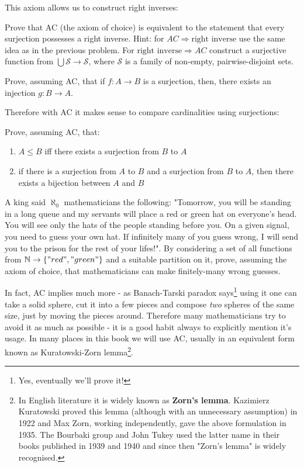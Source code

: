 This axiom allows us to construct right inverses:

\begin{exercise}
  Prove that AC (the axiom of choice) is equivalent to the statement that every surjection possesses a right inverse. Hint: for $AC\Rightarrow \text{right inverse}$ use the same idea as in the previous problem. For
  $\text{right inverse}\Rightarrow AC$ construct a surjective function from $\bigcup \mathcal S\to \mathcal S$, where $\mathcal S$ is a family of non-empty, pairwise-disjoint sets.
\end{exercise}

\begin{exercise}
  Prove, assuming AC, that if $f:A\to B$ is a surjection, then, there exists an injection $g: B\to A$.
\end{exercise}

Therefore with AC it makes sense to compare cardinalities using surjections:

\begin{exercise}
  Prove, assuming AC, that:
  \begin{enumerate}
    \item $A\le B$ iff there exists a surjection from $B$ to $A$
    \item if there is a surjection from $A$ to $B$ and a surjection from $B$ to $A$, then there exists a bijection between $A$ and $B$
  \end{enumerate}
\end{exercise}

\begin{exercise}
  A king said $\aleph_0$ mathematicians the following:
  "Tomorrow, you will be standing in a long queue and my servants will place a red or green hat on everyone's head. You will see only the hats of the people standing before you.
  On a given signal, you need to guess your own hat. If infinitely many of you guess wrong, I will send you to the prison for the rest of your lifes!".
  By considering a set of all functions from $\mathbb N\to \{"red", "green"\}$ and a suitable partition on it, prove, assuming the axiom of choice, that mathematicians can make finitely-many
  wrong guesses.
\end{exercise}

In fact, AC implies much more - as Banach-Tarski paradox says\footnote{Yes, eventually we'll prove it!} using it one can take a solid sphere, cut it into a few pieces and compose \emph{two} spheres of the same size, just by moving the pieces around. Therefore many mathematicians try to avoid it as much as possible - it is a good habit always to explicitly mention it's usage. In many places in this book we will use AC, usually in an equivalent form known as Kuratowski-Zorn lemma\footnote{In English literature it is widely known as \textbf{Zorn's lemma}. Kazimierz Kuratowski proved this lemma (although with an unnecessary assumption) in 1922 and Max Zorn, working independently, gave the above formulation in 1935. The Bourbaki group and John Tukey used the latter name in their books published in 1939 and 1940 and since then "Zorn's lemma" is widely recognised.}.

